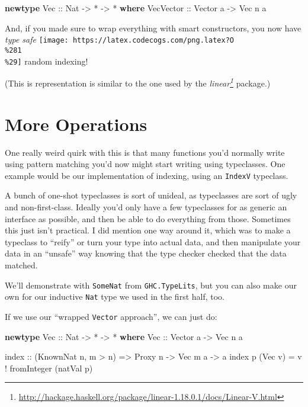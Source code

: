 \documentclass[]{article}
\newenvironment{Shaded}{}{}
\newcommand{\DataTypeTok}[1]{\textcolor[rgb]{0.56,0.13,0.00}{#1}}
\newcommand{\FunctionTok}[1]{\textcolor[rgb]{0.02,0.16,0.49}{#1}}
\newcommand{\KeywordTok}[1]{\textcolor[rgb]{0.00,0.44,0.13}{\textbf{#1}}}
\newcommand{\NormalTok}[1]{#1}
\newcommand{\OperatorTok}[1]{\textcolor[rgb]{0.40,0.40,0.40}{#1}}
\newcommand{\OtherTok}[1]{\textcolor[rgb]{0.00,0.44,0.13}{#1}}
\renewcommand{\href}[2]{#2\footnote{\url{#1}}}
\begin{document}
\begin{Shaded}
\begin{Highlighting}[]
\KeywordTok{newtype} \DataTypeTok{Vec}\OtherTok{ ::} \DataTypeTok{Nat} \OtherTok{{-}>} \OperatorTok{*} \OtherTok{{-}>} \OperatorTok{*} \KeywordTok{where}
    \DataTypeTok{VecVector}\OtherTok{ ::} \DataTypeTok{Vector}\NormalTok{ a }\OtherTok{{-}>} \DataTypeTok{Vec}\NormalTok{ n a}
\end{Highlighting}
\end{Shaded}

And, if you made sure to wrap everything with smart constructors, you now have
\emph{type safe}
\texttt{[image: https://latex.codecogs.com/png.latex?O\\\%281\\\%29]} random
indexing!

(This is representation is similar to the one used by the
\emph{\href{http://hackage.haskell.org/package/linear-1.18.0.1/docs/Linear-V.html}{linear}}
package.)

\hypertarget{more-operations}{%
\section{More Operations}\label{more-operations}}

One really weird quirk with this is that many functions you'd normally write
using pattern matching you'd now might start writing using typeclasses. One
example would be our implementation of indexing, using an \texttt{IndexV}
typeclass.

A bunch of one-shot typeclasses is sort of unideal, as typeclasses are sort of
ugly and non-first-class. Ideally you'd only have a few typeclasses for as
generic an interface as possible, and then be able to do everything from those.
Sometimes this just isn't practical. I did mention one way around it, which was
to make a typeclass to ``reify'' or turn your type into actual data, and then
manipulate your data in an ``unsafe'' way knowing that the type checker checked
that the data matched.

We'll demonstrate with \texttt{SomeNat} from \texttt{GHC.TypeLits}, but you can
also make our own for our inductive \texttt{Nat} type we used in the first half,
too.

If we use our ``wrapped \texttt{Vector} approach'', we can just do:

\begin{Shaded}
\begin{Highlighting}[]
\KeywordTok{newtype} \DataTypeTok{Vec}\OtherTok{ ::} \DataTypeTok{Nat} \OtherTok{{-}>} \OperatorTok{*} \OtherTok{{-}>} \OperatorTok{*} \KeywordTok{where}
    \DataTypeTok{Vec}\OtherTok{ ::} \DataTypeTok{Vector}\NormalTok{ a }\OtherTok{{-}>} \DataTypeTok{Vec}\NormalTok{ n a}

\FunctionTok{index}\OtherTok{ ::}\NormalTok{ (}\DataTypeTok{KnownNat}\NormalTok{ n, m }\OperatorTok{>}\NormalTok{ n) }\OtherTok{=>} \DataTypeTok{Proxy}\NormalTok{ n }\OtherTok{{-}>} \DataTypeTok{Vec}\NormalTok{ m a }\OtherTok{{-}>}\NormalTok{ a}
\FunctionTok{index}\NormalTok{ p (}\DataTypeTok{Vec}\NormalTok{ v) }\OtherTok{=}\NormalTok{ v }\OperatorTok{!} \FunctionTok{fromInteger}\NormalTok{ (natVal p)}
\end{Highlighting}
\end{Shaded}
\end{document}
